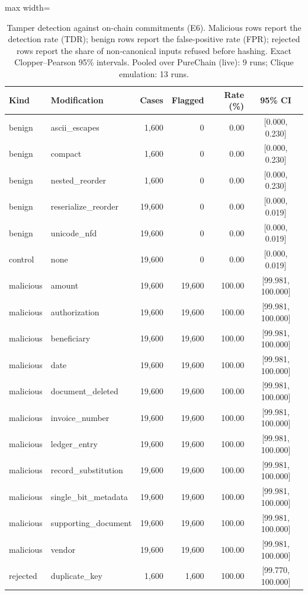 \begin{table}[t]
\centering
\scriptsize
\caption{Tamper detection against on-chain commitments (E6). Malicious rows report the detection rate (TDR); benign rows report the false-positive rate (FPR); rejected rows report the share of non-canonical inputs refused before hashing. Exact Clopper--Pearson 95\% intervals. Pooled over PureChain (live): 9 runs; Clique emulation: 13 runs.}
\label{tab:tamper}
\begin{adjustbox}{max width=\textwidth}
\begin{tabular}{llrrrc}
\toprule
Kind & Modification & Cases & Flagged & Rate (\%) & 95\% CI \\
\midrule
benign & ascii\_escapes & 1,600 & 0 & 0.00 & [0.000, 0.230] \\
benign & compact & 1,600 & 0 & 0.00 & [0.000, 0.230] \\
benign & nested\_reorder & 1,600 & 0 & 0.00 & [0.000, 0.230] \\
benign & reserialize\_reorder & 19,600 & 0 & 0.00 & [0.000, 0.019] \\
benign & unicode\_nfd & 19,600 & 0 & 0.00 & [0.000, 0.019] \\
control & none & 19,600 & 0 & 0.00 & [0.000, 0.019] \\
malicious & amount & 19,600 & 19,600 & 100.00 & [99.981, 100.000] \\
malicious & authorization & 19,600 & 19,600 & 100.00 & [99.981, 100.000] \\
malicious & beneficiary & 19,600 & 19,600 & 100.00 & [99.981, 100.000] \\
malicious & date & 19,600 & 19,600 & 100.00 & [99.981, 100.000] \\
malicious & document\_deleted & 19,600 & 19,600 & 100.00 & [99.981, 100.000] \\
malicious & invoice\_number & 19,600 & 19,600 & 100.00 & [99.981, 100.000] \\
malicious & ledger\_entry & 19,600 & 19,600 & 100.00 & [99.981, 100.000] \\
malicious & record\_substitution & 19,600 & 19,600 & 100.00 & [99.981, 100.000] \\
malicious & single\_bit\_metadata & 19,600 & 19,600 & 100.00 & [99.981, 100.000] \\
malicious & supporting\_document & 19,600 & 19,600 & 100.00 & [99.981, 100.000] \\
malicious & vendor & 19,600 & 19,600 & 100.00 & [99.981, 100.000] \\
rejected & duplicate\_key & 1,600 & 1,600 & 100.00 & [99.770, 100.000] \\

\end{tabular}
\end{adjustbox}
\end{table}
